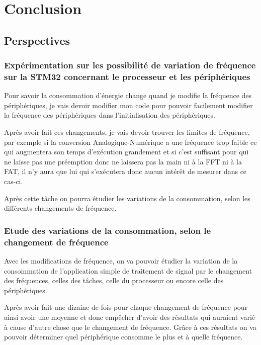 \documentclass[a4paper]{article}
\begin{document}
\section{Conclusion}

\subsection{Perspectives}

\subsubsection{Expérimentation sur les possibilité de variation de fréquence sur la STM32 concernant le processeur et les périphériques}

Pour savoir la consommation d'énergie change quand je modifie la fréquence des périphériques, je vais devoir modifier mon code pour pouvoir facilement modifier la fréquence des périphériques dans l'initialisation des périphériques.

Après avoir fait ces changements, je vais devoir trouver les limites de fréquence, par exemple si la conversion Analogique-Numérique a une fréquence trop faible ce qui augmentera son temps d'exécution grandement et si c'est suffisant pour qui ne laisse pas une préemption donc ne laissera pas la main ni à la FFT ni à la FAT, il n'y aura que lui qui s'exécutera donc aucun intérêt de mesurer dans ce cas-ci.

Après cette tâche on pourra étudier les variations de la consommation, selon les différents changements de fréquence.

\subsubsection{Etude des variations de la consommation, selon le changement de fréquence}  

Avec les modifications de fréquence, on va pouvoir étudier la variation de la consommation de l'application simple de traitement de signal par le changement des fréquences, celles des tâches, celle du processeur ou encore celle des périphériques.

Après avoir fait une dizaine de fois pour chaque changement de fréquence pour ainsi avoir une moyenne et donc empêcher d'avoir des résultats qui auraient varié à cause d'autre chose que le changement de fréquence. Grâce à ces résultats on va pouvoir déterminer quel périphérique consomme le plus et à quelle fréquence. 
\end{document}
